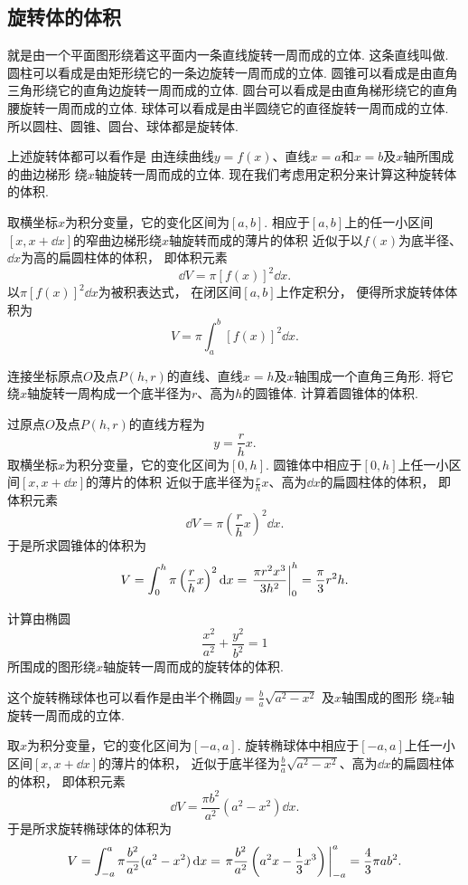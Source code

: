 \subsection{旋转体的体积}
就是由一个平面图形绕着这平面内一条直线旋转一周而成的立体.
这条直线叫做.
圆柱可以看成是由矩形绕它的一条边旋转一周而成的立体.
圆锥可以看成是由直角三角形绕它的直角边旋转一周而成的立体.
圆台可以看成是由直角梯形绕它的直角腰旋转一周而成的立体.
球体可以看成是由半圆绕它的直径旋转一周而成的立体.
所以圆柱、圆锥、圆台、球体都是旋转体.

上述旋转体都可以看作是
由连续曲线\(y=f(x)\)、直线\(x=a\)和\(x=b\)及\(x\)轴所围成的曲边梯形
绕\(x\)轴旋转一周而成的立体.
现在我们考虑用定积分来计算这种旋转体的体积.

取横坐标\(x\)为积分变量，它的变化区间为\([a,b]\).
相应于\([a,b]\)上的任一小区间\([x,x+\dd{x}]\)的窄曲边梯形绕\(x\)轴旋转而成的薄片的体积
近似于以\(f(x)\)为底半径、\(\dd{x}\)为高的扁圆柱体的体积，
即体积元素\[
	\dd{V} = \pi [f(x)]^2 \dd{x}.
\]
以\(\pi [f(x)]^2 \dd{x}\)为被积表达式，
在闭区间\([a,b]\)上作定积分，
便得所求旋转体体积为\begin{equation}\label{equation:定积分.曲边梯形绕x轴旋转体的体积}
	V = \pi \int_a^b [f(x)]^2 \dd{x}.
\end{equation}

\begin{example}
连接坐标原点\(O\)及点\(P(h,r)\)的直线、直线\(x=h\)及\(x\)轴围成一个直角三角形.
将它绕\(x\)轴旋转一周构成一个底半径为\(r\)、高为\(h\)的圆锥体.
计算着圆锥体的体积.
\begin{solution}
过原点\(O\)及点\(P(h,r)\)的直线方程为\[
	y = \frac{r}{h} x.
\]
取横坐标\(x\)为积分变量，它的变化区间为\([0,h]\).
圆锥体中相应于\([0,h]\)上任一小区间\([x,x+\dd{x}]\)的薄片的体积
近似于底半径为\(\frac{r}{h} x\)、高为\(\dd{x}\)的扁圆柱体的体积，
即体积元素\[
	\dd{V} = \pi \left(\frac{r}{h} x\right)^2 \dd{x}.
\]
于是所求圆锥体的体积为\[
	V = \int_0^h \pi \left(\frac{r}{h} x\right)^2 \dd{x}
	= \eval{\frac{\pi r^2 x^3}{3 h^2}}_0^h
	= \frac\pi3 r^2 h.
\]
\end{solution}
\end{example}

\begin{example}
计算由椭圆\[
	\frac{x^2}{a^2}+\frac{y^2}{b^2}=1
\]所围成的图形绕\(x\)轴旋转一周而成的旋转体的体积.
\begin{solution}
这个旋转椭球体也可以看作是由半个椭圆\(y = \frac{b}{a} \sqrt{a^2-x^2}\)
及\(x\)轴围成的图形
绕\(x\)轴旋转一周而成的立体.

取\(x\)为积分变量，它的变化区间为\([-a,a]\).
旋转椭球体中相应于\([-a,a]\)上任一小区间\([x,x+\dd{x}]\)的薄片的体积，
近似于底半径为\(\frac{b}{a} \sqrt{a^2-x^2}\)、高为\(\dd{x}\)的扁圆柱体的体积，
即体积元素\[
	\dd{V} = \frac{\pi b^2}{a^2} (a^2-x^2) \dd{x}.
\]
于是所求旋转椭球体的体积为\[
	V = \int_{-a}^a \pi \frac{b^2}{a^2} (a^2-x^2) \dd{x}
	= \eval{\pi \frac{b^2}{a^2} \left(a^2x-\frac13x^3\right)}_{-a}^a
	= \frac43 \pi a b^2.
\]
\end{solution}
\end{example}

